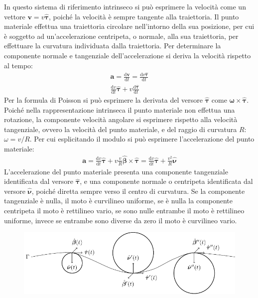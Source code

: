 \documentclass{article}
\newcommand{\vect}[1]{\boldsymbol{\mathbf{#1}}}
\newcommand{\df}{\mathrm{d}}
\numberwithin{equation}{subsection}
\begin{document}
In questo sistema di riferimento intrinseco si può esprimere la velocità come un vettore $\vect{v}=v\hat{\vect\tau}$, poiché la velocità è sempre tangente alla traiettoria. Il punto 
materiale effettua una traiettoria circolare nell'intorno della sua posizione, per cui è soggetto ad un'accelerazione centripeta, o normale, alla sua traiettoria, per 
effettuare la curvatura individuata dalla traiettoria. Per determinare la componente normale e tangenziale dell'accelerazione si deriva la velocità rispetto al tempo:
\begin{gather*}
    \vect{a}=\displaystyle\frac{\df\vect{v}}{\df t}=\frac{\df v\hat{\vect\tau}}{\df t}\\
    \displaystyle\frac{\df v}{\df t}\hat{\vect\tau}+v\frac{\df\hat{\vect\tau}}{\df t}
\end{gather*}
Per la formula di Poisson si può esprimere la derivata del versore $\hat{\vect\tau}$ come $\vect{\omega}\times\hat{\vect\tau}$. Poiché nella rappresentazione 
intrinseca il punto materiale non effettua una rotazione, la componente velocità angolare si esprimere rispetto alla velocità tangenziale, ovvero la velocità del punto 
materiale, e del raggio di curvatura $R$: $\omega={v}/{R}$. Per cui esplicitando il modulo si può esprimere l'accelerazione del punto materiale:
\begin{gather}
    \vect{a}=\displaystyle\frac{\df v}{\df t}\hat{\vect\tau}+v\frac{v}{R}\hat{\vect\beta}\times\hat{\vect\tau}=\frac{\df v}{\df t}\hat{\vect\tau}+\frac{v^2}{R}\hat{\vect\nu}
\end{gather}
L'accelerazione del punto materiale presenta una componente tangenziale identificata dal versore $\hat{\vect{\tau}}$, e una componente normale o centripeta identificata dal versore $\hat{\vect{\nu}}$, 
poiché diretta sempre verso il centro di curvatura. Se la componente tangenziale è nulla, il moto è curvilineo uniforme, se è nulla la componente centripeta il moto è 
rettilineo vario, se sono nulle entrambe il moto è rettilineo uniforme, invece se entrambe sono diverse da zero il moto è curvilineo vario. 

\begin{figure}[H]%
    \centering
    \includegraphics{moto-curvilineo-2.pdf}%
\end{figure}
\end{document}

